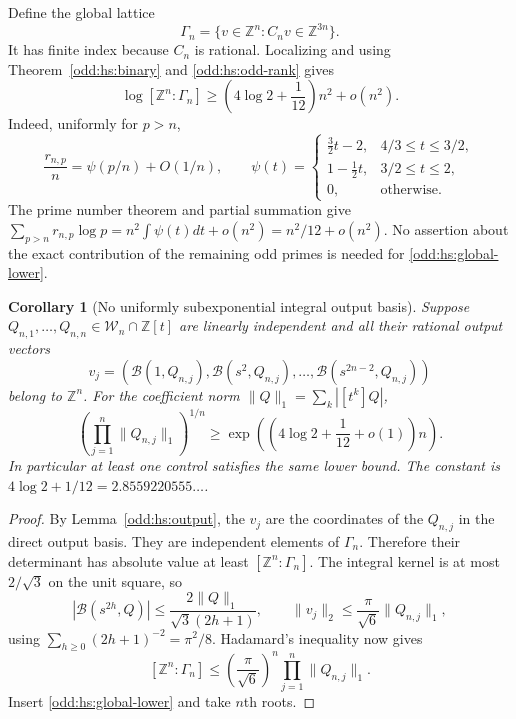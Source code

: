 \documentclass[11pt,a4paper]{article}
\numberwithin{equation}{section}
\newtheorem{corollary}[theorem]{Corollary}
\theoremstyle{definition}\newtheorem{definition}[theorem]{Definition}
\theoremstyle{remark}\newtheorem{remark}[theorem]{Remark}
\begin{document}
Define the global lattice
\[
 \Gamma_n=\{v\in\mathbb Z^n:C_nv\in\mathbb Z^{3n}\}.
\]
It has finite index because $C_n$ is rational. Localizing and using
Theorem~\ref{odd:hs:binary} and \eqref{odd:hs:odd-rank} gives
\begin{equation}\label{odd:hs:global-lower}
 \log[\mathbb Z^n:\Gamma_n]
 \ge\left(4\log2+\frac1{12}\right)n^2+o(n^2).
\end{equation}
Indeed, uniformly for $p>n$,
\[
 \frac{r_{n,p}}n=\psi(p/n)+O(1/n),\qquad
 \psi(t)=
 \begin{cases}
  \frac32t-2,&4/3\le t\le3/2,\\
  1-\frac12t,&3/2\le t\le2,\\
  0,&\text{otherwise}.
 \end{cases}
\]
The prime number theorem and partial summation give
$\sum_{p>n}r_{n,p}\log p=n^2\int\psi(t)dt+o(n^2)
=n^2/12+o(n^2)$. No assertion about the exact contribution of the
remaining odd primes is needed for \eqref{odd:hs:global-lower}.

\begin{corollary}[No uniformly subexponential integral output basis]
\label{odd:hs:height-obstruction}
Suppose $Q_{n,1},\ldots,Q_{n,n}\in\mathscr W_n\cap\mathbb Z[t]$
are linearly independent and all their rational output vectors
\[
 v_j=(\mathcal B(1,Q_{n,j}),\mathcal B(s^2,Q_{n,j}),\ldots,
                   \mathcal B(s^{2n-2},Q_{n,j}))
\]
belong to $\mathbb Z^n$. For the coefficient norm
$\|Q\|_1=\sum_k|[t^k]Q|$,
\begin{equation}\label{odd:hs:height}
 \left(\prod_{j=1}^n\|Q_{n,j}\|_1\right)^{1/n}
 \ge \exp\left(\left(4\log2+\frac1{12}+o(1)\right)n\right).
\end{equation}
In particular at least one control satisfies the same lower bound.
The constant is $4\log2+1/12=2.8559220555\ldots$.
\end{corollary}
\begin{proof}
By Lemma~\ref{odd:hs:output}, the $v_j$ are the coordinates of the $Q_{n,j}$
in the direct output basis. They are independent elements of $\Gamma_n$.
Therefore their determinant has absolute value at least
$[\mathbb Z^n:\Gamma_n]$. The integral kernel is at most $2/\sqrt3$
on the unit square, so
\[
 |\mathcal B(s^{2h},Q)|\le\frac{2\|Q\|_1}{\sqrt3(2h+1)},
 \qquad
 \|v_j\|_2\le\frac\pi{\sqrt6}\|Q_{n,j}\|_1,
\]
using $\sum_{h\ge0}(2h+1)^{-2}=\pi^2/8$. Hadamard's inequality
now gives
\[
 [\mathbb Z^n:\Gamma_n]\le
       \left(\frac\pi{\sqrt6}\right)^n
                  \prod_{j=1}^n\|Q_{n,j}\|_1.
\]
Insert \eqref{odd:hs:global-lower} and take $n$th roots.
\end{proof}
\end{document}
